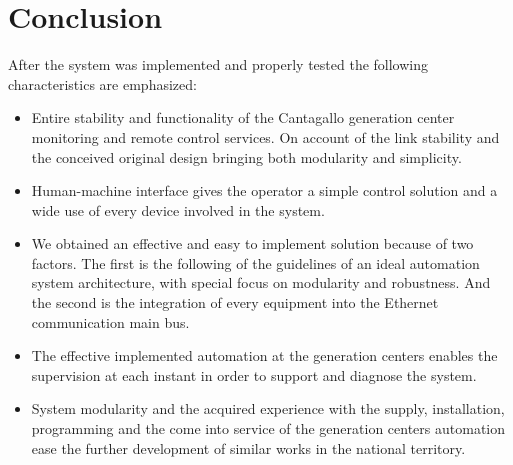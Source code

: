 
\section{Conclusion}

After the system was implemented and properly tested the following characteristics are emphasized:

\begin{itemize}
\item Entire stability and functionality of the Cantagallo generation
  center monitoring and remote control services. On account of the
  link stability and the conceived original design bringing both
  modularity and simplicity.
\item Human-machine interface gives the operator a simple control
  solution and a wide use of every device involved in the system.
\item We obtained an effective and easy to implement solution because of two
  factors. The first is the following of the guidelines of an ideal
  automation system architecture, with special focus on modularity and
  robustness. And the second is the integration of every equipment into
  the Ethernet communication main bus.
\item The effective implemented automation at the generation centers
  enables the supervision at each instant in order to support and
  diagnose the system.
\item System modularity and the acquired experience with the supply,
  installation, programming and the come into service of the generation
  centers automation ease the further development of similar works in
  the national territory.
\end{itemize}

